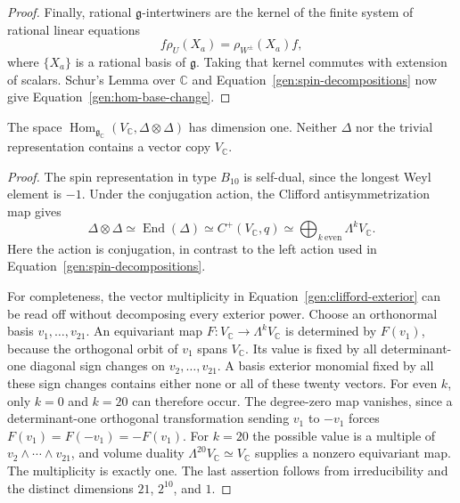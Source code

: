 \begin{proof}
Finally, rational $\mathfrak g$-intertwiners are the kernel of the
finite system of rational linear equations
\[
 f\rho_U(X_a)=\rho_{W^\pm}(X_a)f,
\]
where $\{X_a\}$ is a rational basis of $\mathfrak g$.
Taking that kernel commutes with extension of scalars.  Schur's
Lemma over $\mathbb C$ and Equation~\eqref{gen:spin-decompositions}
now give Equation~\eqref{gen:hom-base-change}.
\end{proof}

\begin{lemma}\label{gen:vector-multiplicity}
The space
$\operatorname{Hom}_{\mathfrak g_{\mathbb C}}
 (V_{\mathbb C},\Delta\otimes\Delta)$ has dimension one.
Neither $\Delta$ nor the trivial representation contains a vector
copy $V_{\mathbb C}$.
\end{lemma}

\begin{proof}
The spin representation in type $B_{10}$ is self-dual, since the
longest Weyl element is $-1$.  Under the conjugation action, the
Clifford antisymmetrization map gives
\begin{equation}\label{gen:clifford-exterior}
 \Delta\otimes\Delta\simeq\operatorname{End}(\Delta)
 \simeq C^+(V_{\mathbb C},q)
 \simeq\bigoplus_{k\ \mathrm{even}}\Lambda^kV_{\mathbb C}.
\end{equation}
Here the action is conjugation, in contrast to the left action used
in Equation~\eqref{gen:spin-decompositions}.

For completeness, the vector multiplicity in
Equation~\eqref{gen:clifford-exterior} can be read off without
decomposing every exterior power.  Choose an orthonormal basis
$v_1,\ldots,v_{21}$.  An equivariant map
$F:V_{\mathbb C}\to\Lambda^kV_{\mathbb C}$ is determined by $F(v_1)$,
because the orthogonal orbit of $v_1$ spans $V_{\mathbb C}$.
Its value is fixed by all determinant-one diagonal sign changes on
$v_2,\ldots,v_{21}$.  A basis exterior monomial fixed by all these
sign changes contains either none or all of these twenty vectors.
For even $k$, only $k=0$ and $k=20$ can therefore occur.
The degree-zero map vanishes, since a determinant-one orthogonal
transformation sending $v_1$ to $-v_1$ forces
$F(v_1)=F(-v_1)=-F(v_1)$.  For $k=20$ the possible value is a multiple
of $v_2\wedge\cdots\wedge v_{21}$, and volume duality
$\Lambda^{20}V_{\mathbb C}\simeq V_{\mathbb C}$ supplies a nonzero
equivariant map.  The multiplicity is exactly one.
The last assertion follows from irreducibility and the distinct
dimensions $21$, $2^{10}$, and $1$.
\end{proof}

